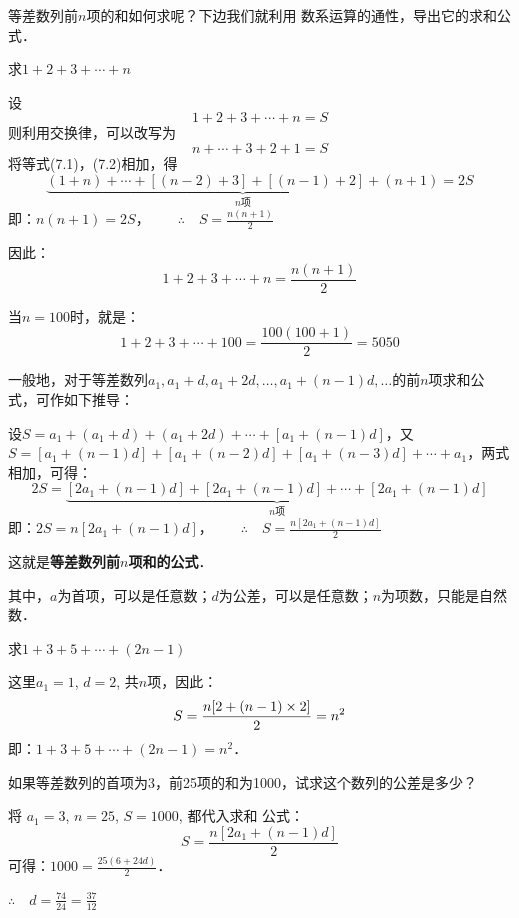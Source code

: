 等差数列前$n$项的和如何求呢？下边我们就利用
数系运算的通性，导出它的求和公式．

\begin{example}
    求$1+2+3+\cdots+n$
\end{example}

\begin{solution}
    设
    \begin{equation}
        1+2+3+\cdots+n=S
    \end{equation}
    则利用交换律，可以改写为
    \begin{equation}
        n+\cdots+3+2+1=S
    \end{equation}
将等式(7.1)，(7.2)相加，得
\[\underbrace{(1+n)+\cdots +[(n-2)+3]+[(n-1)+2]+(n+1)}_{n\text{项}}=2S\]
即：$n(n+1)=2S$，$\qquad \therefore\quad S=\frac{n(n+1)}{2}$
\end{solution}


因此：
\[1+2+3+\cdots+n=\frac{n(n+1)}{2}\]

当$n=100$时，就是：
\[1+2+3+\cdots+100=\frac{100(100+1)}{2}=5050\]

一般地，对于等差数列$a_1,a_1+d,a_1+2d,\ldots,a_1+(n-1)d,\ldots$的前$n$项求和公式，可作如下推导：

设$S=a_1+(a_1+d)+(a_1+2d)+\cdots+[a_1+(n-1)d]$，又
$S=[a_1+(n-1)d]+[a_1+(n-2)d]+[a_1+(n-3)d]+\cdots+a_1$，两式相加，可得：
\[2S=\underbrace{[2a_1+(n-1)d]+[2a_1+(n-1)d]+\cdots+[2a_1+(n-1)d]}_{n\text{项}}\]
即：$2S=n[2a_1+(n-1)d]$，$\qquad \therefore\quad S=\frac{n[2a_1+(n-1)d]}{2}$

这就是\textbf{等差数列前$n$项和的公式}．

其中，$a$为首项，可以是任意数；$d$为公差，可以是任意数；$n$为项数，只能是自然数．

\begin{example}
    求$1+3+5+\cdots+(2n-1)$
\end{example}

\begin{solution}
    这里$a_1=1$, $d=2$, 共$n$项，因此：
\[S=\dfrac{n[2+(n-1)\times 2]}{2}=n^2 \]
即：$1+3+5+\cdots+(2n-1)=n^2$．
\end{solution}

\begin{example}
    如果等差数列的首项为3，前25项的和为1000，试求这个数列的公差是多少？
\end{example}

\begin{solution}
    将 $a_1=3$, $n=25$, $S=1000$, 都代入求和
公式：
\[S=\frac{n [2a_1+ (n-1) d]}{2}\]
可得：$1000=\frac{25(6+24d)}{2}$．

$\therefore\quad d=\frac{74}{24}=\frac{37}{12}$
\end{solution}

